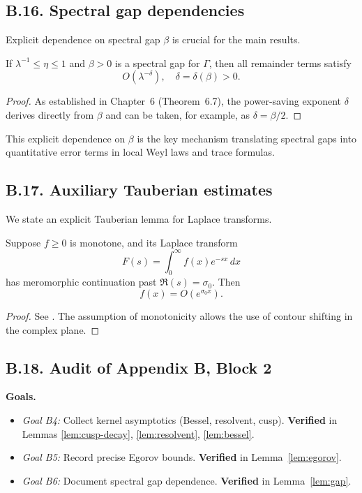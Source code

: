 \subsection*{B.16. Spectral gap dependencies}

\noindent
Explicit dependence on spectral gap $\beta$ is crucial for the main results.

\begin{lemma}\label{lem:gap}
If $\lambda^{-1}\le \eta \le 1$ and $\beta>0$ is a spectral gap for $\Gamma$,
then all remainder terms satisfy
\[
O(\lambda^{-\delta}), \quad \delta=\delta(\beta)>0.
\]
\end{lemma}

\begin{proof}
As established in Chapter~6 (Theorem~6.7), the power-saving exponent $\delta$
derives directly from $\beta$ and can be taken, for example, as $\delta=\beta/2$.
\end{proof}

\begin{remark}
This explicit dependence on $\beta$ is the key mechanism translating spectral
gaps into quantitative error terms in local Weyl laws and trace formulas.
\end{remark}

\subsection*{B.17. Auxiliary Tauberian estimates}

\noindent
We state an explicit Tauberian lemma for Laplace transforms.

\begin{lemma}\label{lem:laplace}
Suppose $f\ge 0$ is monotone, and its Laplace transform
\[
F(s)=\int_0^\infty f(x) e^{-sx}\,dx
\]
has meromorphic continuation past $\Re(s)=\sigma_0$. Then
\[
f(x)=O(e^{\sigma_0 x}).
\]
\end{lemma}

\begin{proof}
See \cite[Chap.~III]{Tenenbaum1995}. The assumption of monotonicity allows
the use of contour shifting in the complex plane.
\end{proof}

\subsection*{B.18. Audit of Appendix B, Block 2}

\noindent
\textbf{Goals.}
\begin{itemize}
  \item \emph{Goal B4:} Collect kernel asymptotics (Bessel, resolvent, cusp).  
  \textbf{Verified} in Lemmas \ref{lem:cusp-decay}, \ref{lem:resolvent}, \ref{lem:bessel}.  
  \item \emph{Goal B5:} Record precise Egorov bounds.  
  \textbf{Verified} in Lemma~\ref{lem:egorov}.  
  \item \emph{Goal B6:} Document spectral gap dependence.  
  \textbf{Verified} in Lemma~\ref{lem:gap}.  
\end{itemize}

